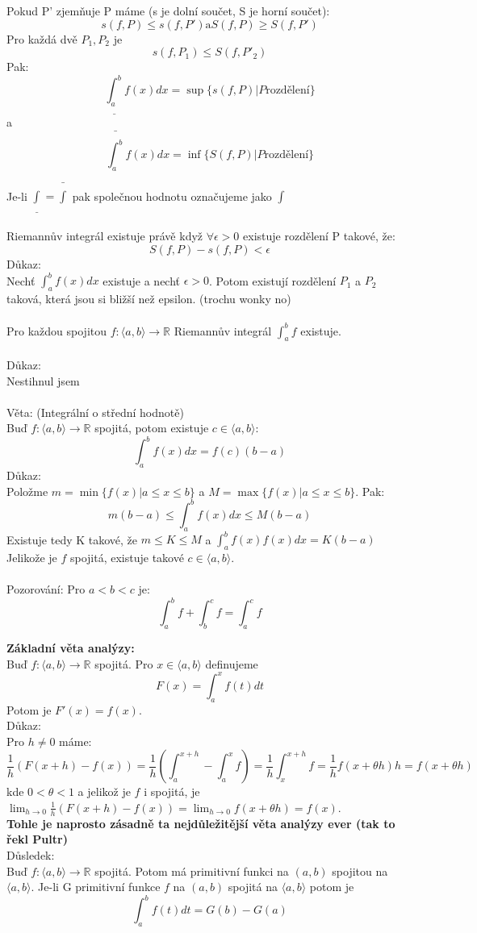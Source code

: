\documentclass{article}
\begin{document}
Pokud P' zjemňuje P máme (s je dolní součet, S je horní součet):
$$s(f,P) \leq s(f,P') \text{a} S(f,P) \geq S(f,P')$$
Pro každá dvě $P_{1},P_{2}$ je 
$$s(f,P_{1}) \leq S(f,P'_{2})$$
Pak:
$$\underline{\int_{a}^{b}}f(x)dx = \sup\{s(f,P) | P \text{rozdělení}\}$$ a
$$\bar{\int_{a}^{b}}f(x)dx = \inf\{S(f,P) | P \text{rozdělení}\}$$

Je-li $\underline{\int} = \bar{\int}$ pak společnou hodnotu označujeme jako $\int$\\\\

Riemannův integrál existuje právě když $\forall \epsilon > 0$ existuje rozdělení P takové, že:
$$S(f,P) - s(f,P) < \epsilon$$
Důkaz:\\
Nechť $\int_{a}^{b}f(x)dx$ existuje a nechť $\epsilon > 0$. Potom existují rozdělení $P_{1}$ a $P_{2}$ taková, která jsou si bližší než epsilon. (trochu wonky no)\\\\

Pro každou spojitou $f:\langle a , b \rangle \rightarrow \mathbb{R}$ Riemannův integrál $\int_{a}^{b}f$ existuje.\\\\

Důkaz:\\
Nestihnul jsem\\\\ %

Věta: (Integrální o střední hodnotě)\\
Buď $f:\langle a , b \rangle \rightarrow \mathbb{R}$ spojitá, potom existuje $c \in \langle a,b \rangle$:
$$\int_{a}^{b}f(x)dx = f(c)(b-a)$$
Důkaz:\\
Položme $m = \min\{f(x) | a \leq x \leq b\}$ a $M = \max\{f(x) | a \leq x \leq b\}$. Pak:
$$ m(b-a) \leq  \int_{a}^{b}f(x)dx \leq M(b-a)$$
Existuje tedy K takové, že $m\leq K \leq M$ a $\int_{a}^{b}f(x)f(x)dx = K(b-a)$ Jelikože je $f$ spojitá, existuje takové $c \in \langle a,b \rangle$.\\\\

Pozorování: Pro $a<b<c$ je:
$$\int_{a}^{b}f + \int_{b}^{c}f = \int_{a}^{c}f$$

\textbf{Základní věta analýzy:}\\
Buď $f:\langle a , b \rangle \rightarrow \mathbb{R}$ spojitá. Pro $x \in \langle a , b \rangle$ definujeme
$$F(x) = \int_{a}^{x}f(t)dt$$
Potom je $F'(x) = f(x)$.\\

Důkaz:\\
Pro $h \neq 0$ máme:
$$\frac{1}{h}(F(x+h) - f(x)) = \frac{1}{h}(\int_{a}^{x+h} - \int_{a}^{x}f) = \frac{1}{h}\int_{x}^{x+h}f = \frac{1}{h}f(x+\theta h)h = f(x+ \theta h)$$
kde $0 < \theta < 1$ a jelikož je $f$ i spojitá, je $\lim_{h\rightarrow 0}\frac{1}{h}(F(x+h)-f(x)) = \lim_{h \rightarrow 0}f(x+\theta h) = f(x)$.\\
\textbf{Tohle je naprosto zásadně ta nejdůležitější věta analýzy ever (tak to řekl Pultr)}\\

Důsledek:\\
Buď $f:\langle a , b \rangle \rightarrow \mathbb{R}$ spojitá. Potom má primitivní funkci na $(a,b)$ spojitou na $\langle a, b \rangle$. Je-li G primitivní funkce $f$ na $(a,b)$
spojitá na $\langle a,b \rangle$ potom je
$$\int_{a}^{b}f(t)dt = G(b)-G(a)$$
\end{document}
